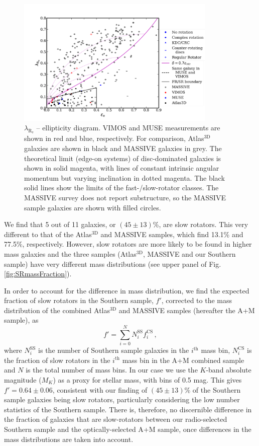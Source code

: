 			\begin{figure}
				\centering
				\includegraphics[width=0.85\textwidth]{chapter4/lambda_R_ellipticity.png}
				\caption[$\lambda_\mathrm{R_e}$ -- ellipticity diagram]{$\lambda_\mathrm{R_e}$ -- ellipticity diagram. VIMOS and MUSE measurements are shown in red and blue, respectively. For comparison, Atlas$^\text{3D}$ galaxies \citep{Emsellem2011} are shown in black and MASSIVE galaxies \citep{Veale2017} in grey. The theoretical limit (edge-on systems) of disc-dominated galaxies is shown in solid magenta, with lines of constant intrinsic angular momentum but varying inclination in dotted magenta. The black solid lines show the limits of the fast-/slow-rotator classes. The MASSIVE survey does not report substructure, so the MASSIVE sample galaxies are shown with filled circles.}
				\label{fig:lambdaR_ellip}
			\end{figure}
			We find that 5 out of 11 galaxies, or $(45\pm13)$\%, are slow rotators. This very different to that of the Atlas$^\text{3D}$ and MASSIVE samples, which find 13.1\% and 77.5\%, respectively. However, slow rotators are more likely to be found in higher mass galaxies and the three samples (Atlas$^\text{3D}$, MASSIVE and our Southern sample) have very different mass distributions (see upper panel of Fig.\,\ref{fig:SRmassFraction}).

			In order to account for the difference in mass distribution, we find the expected fraction of slow rotators in the Southern sample, $f'$, corrected to the mass distribution of the combined Atlas$^\text{3D}$ and MASSIVE samples (hereafter the A+M sample), as
			\begin{equation}
				f' = \sum_{i=0}^N N^\mathrm{SS}_i f^\mathrm{CS}_i \, , 
			\end{equation}
			where $N^\mathrm{SS}_i$ is the number of Southern sample galaxies in the $i^\mathrm{th}$ mass bin, $N^\mathrm{CS}_i$ is the fraction of slow rotators in the $i^\mathrm{th}$ mass bin in the A+M combined sample and $N$ is the total number of mass bins. In our case we use the $K$-band absolute magnitude ($M_K$) as a proxy for stellar mass, with bins of 0.5 mag. This gives $f' = 0.64 \pm 0.06$, consistent with our finding of $(45\pm13)$\% of the Southern sample galaxies being slow rotators, particularly considering the low number statistics of the Southern sample. There is, therefore, no discernible difference in the fraction of galaxies that are slow-rotators between our radio-selected Southern sample and the optically-selected A+M sample, once differences in the mass distributions are taken into account. 

